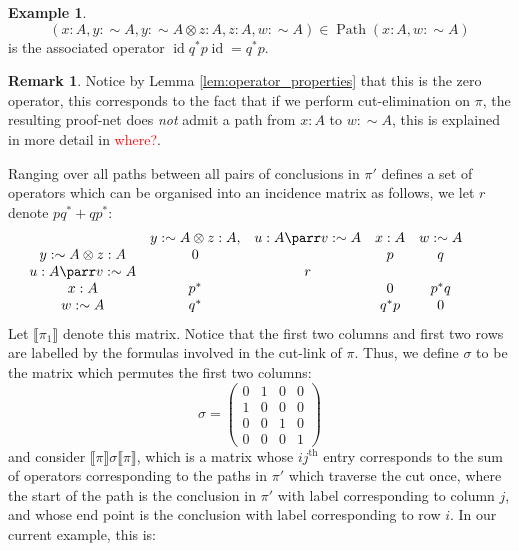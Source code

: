 \documentclass[12pt]{article}
\theoremstyle{plain}
\theoremstyle{definition}
\newtheorem{remark}[thm]{Remark}
\newtheorem{example}[thm]{Example}
\newcommand{\negation}{\sim}
\begin{document}
\begin{example}
\begin{equation}
(x:A, y: \negation A, y: \negation A \otimes z: A, z:A, w:\negation A) \in \operatorname{Path}(x:A, w:\negation A)
\end{equation}
is the associated operator $\operatorname{id}q^\ast p\operatorname{id} = q^\ast p$. 
\begin{remark}
Notice by Lemma \ref{lem:operator_properties} that this is the zero operator, this corresponds to the fact that if we perform cut-elimination on $\pi$, the resulting proof-net does \emph{not} admit a path from $x:A$ to $w:\negation A$, this is explained in more detail in \textcolor{red}{where?}.
\end{remark}
Ranging over all paths between all pairs of conclusions in $\pi'$ defines a set of operators which can be organised into an incidence matrix as follows, we let $r$ denote $pq^\ast + qp^\ast$:
\begin{equation}
\begin{matrix}
& y: \negation A \otimes z: A, & u: A \parr v: \negation A & x: A &  w: \negation A \\
y: \negation A \otimes z: A &0&&p&q&&\\
u: A \parr v: \negation A &&r&\\
x: A &p^\ast&&0& p^\ast q&&\\
w: \negation A &q^\ast&& q^\ast p&0
\end{matrix}
\end{equation}
Let $\llbracket \pi_1 \rrbracket$ denote this matrix. Notice that the first two columns and first two rows are labelled by the formulas involved in the cut-link of $\pi$. Thus, we define $\sigma$ to be the matrix which permutes the first two columns:
\begin{equation}
\sigma =
\begin{pmatrix}
0 & 1 & 0 & 0\\
1 & 0 & 0 & 0\\
0 & 0 & 1 & 0\\
0 & 0 & 0 & 1
\end{pmatrix}
\end{equation}
and consider $\llbracket \pi \rrbracket \sigma \llbracket \pi \rrbracket$, which is a matrix whose $ij^{\text{th}}$ entry corresponds to the sum of operators corresponding to the paths in $\pi'$ which traverse the cut once, where the start of the path is the conclusion in $\pi'$ with label corresponding to column $j$, and whose end point is the conclusion with label corresponding to row $i$. In our current example, this is:

\end{example}
\end{document}
